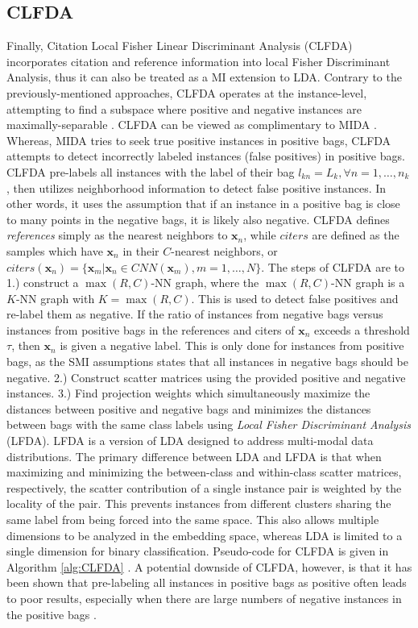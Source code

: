 \subsection{CLFDA} \label{sec:CLFDA}
Finally, Citation Local Fisher Linear Discriminant Analysis (CLFDA) \citep{Kim2010LocalDRMIL} incorporates citation and reference information into local Fisher Discriminant Analysis, thus it can also be treated as a MI extension to LDA.  Contrary to the previously-mentioned approaches, CLFDA operates at the instance-level, attempting to find a subspace where positive and negative instances are maximally-separable \citep{Latham2015MIFeatureRankingThesis}.  CLFDA can be viewed as complimentary to MIDA \citep{Chai2014MIDA}.  Whereas, MIDA tries to seek true positive instances in positive bags, CLFDA attempts to detect incorrectly labeled instances (false positives) in positive bags.  CLFDA pre-labels all instances with the label of their bag  $l_{kn} = L_{k}, \forall n = 1,\dots,n_{k}$, then utilizes neighborhood information to detect false positive instances.  In other words, it uses the assumption that if an instance in a positive bag is close to many points in the negative bags, it is likely also negative.  CLFDA defines \textit{references} simply as the nearest neighbors to $\bm{x}_{n}$, while $citers$ are defined as the samples which have $\bm{x}_{n}$ in their $C$-nearest neighbors, or $citers(\bm{x}_{n}) = \{ \bm{x}_{m}| \bm{x}_{n} \in CNN(\bm{x}_{m}), m=1, \dots, N \}$.   The steps of CLFDA are to 1.) construct a $\max(R,C)$-NN graph, where the $\max(R,C)$-NN graph is a $K$-NN graph with $K=\max(R,C)$.  This is used to detect false positives and re-label them as negative.  If the ratio of instances from negative bags versus instances from positive bags in the references and citers of $\bm{x}_n$ exceeds a threshold $\tau$, then $\bm{x}_{n}$ is given a negative label. This is only done for instances from positive bags, as the SMI assumptions states that all instances in negative bags should be negative. 2.) Construct scatter matrices using the provided positive and negative instances. 3.) Find projection weights which simultaneously maximize the distances between positive and negative bags and minimizes the distances between bags with the same class labels using \textit{Local Fisher Discriminant Analysis} (LFDA).  LFDA is a version of LDA  designed to address multi-modal data distributions.  The primary difference between LDA and LFDA is that when maximizing and minimizing the between-class and within-class scatter matrices, respectively, the scatter contribution of a single instance pair is weighted by the locality of the pair.  This prevents instances from different clusters sharing the same label from being forced into  the same space.  This also allows multiple dimensions to be analyzed in the embedding space, whereas LDA is limited to a single dimension for binary classification.  Pseudo-code for CLFDA is given in Algorithm \ref{alg:CLFDA} \citep{Latham2015MIFeatureRankingThesis}.  A potential downside of CLFDA, however, is that it has been shown that pre-labeling all instances in positive bags as positive often leads to poor results, especially when there are large numbers of negative instances in the positive bags \citep{Chai2014MIDA}.


